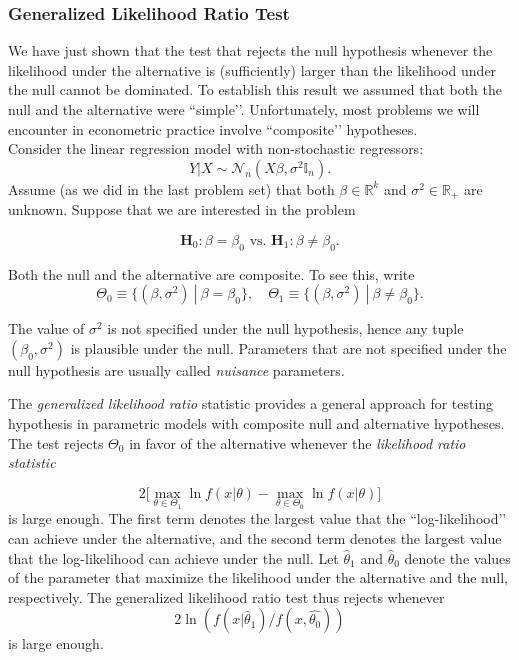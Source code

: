 \documentclass[11pt]{article} %
\begin{document}
\subsubsection{Generalized Likelihood Ratio Test}

We have just shown that the test that rejects the null hypothesis whenever the likelihood under the alternative is (sufficiently) larger than the likelihood under the null cannot be dominated. To establish this result we assumed that both the null and the alternative were ``simple’’. Unfortunately, most problems we will encounter in econometric practice involve ``composite’’ hypotheses.  \\

 Consider the linear regression model with non-stochastic regressors:
\begin{equation}
Y | X \sim \mathcal{N}_n(X \beta, \sigma^2 \mathbb{I}_n ).
\end{equation}
Assume (as we did in the last problem set) that both $\beta \in \mathbb{R}^{k}$ and $\sigma^2 \in \mathbb{R}_{+}$ are unknown. Suppose that we are interested in the problem

\begin{equation}\label{equation:Hypothesis}
\textbf{H}_0: \beta=\beta_0 \textrm{ vs. }  \textbf{H}_1: \beta \neq \beta_0. 
\end{equation}

\noindent Both the null and the alternative  are composite. To see this, write
\[ \Theta_0 \equiv \{ (\beta, \sigma^2) \: | \: \beta = \beta_0 \}, \quad \Theta_1 \equiv \{ (\beta, \sigma^2) \: | \: \beta \neq \beta_0 \}.\]

\noindent The value of $\sigma^2$ is not specified under the null hypothesis, hence any tuple $(\beta_0, \sigma^2)$ is plausible under the null. Parameters that are not specified under the null hypothesis are usually called \emph{nuisance} parameters.

The \emph{generalized likelihood ratio} statistic provides a general approach for testing hypothesis in parametric models with composite null and alternative hypotheses. The test rejects $\Theta_0$ in favor of the alternative whenever the \emph{likelihood ratio statistic}

\begin{equation}
2\Big [  \max_{\theta \in \Theta_1} \ln f(x | \theta) - \max_{\theta \in \Theta_0} \ln f(x | \theta) \Big ]
\end{equation}
is large enough. The first term denotes the largest value that the ``log-likelihood’’ can achieve under the alternative, and the second term denotes the largest value that the log-likelihood can achieve under the null. Let $\widehat{\theta}_1$ and $\widehat{\theta}_0$ denote the values of the parameter that maximize the likelihood under the alternative and the null, respectively. The generalized likelihood ratio test thus rejects whenever
\[ 2 \ln \left(  f(x | \widehat{\theta}_1) / f(x, \widehat{\theta_0}) \right) \]
is large enough. \\
\end{document}
